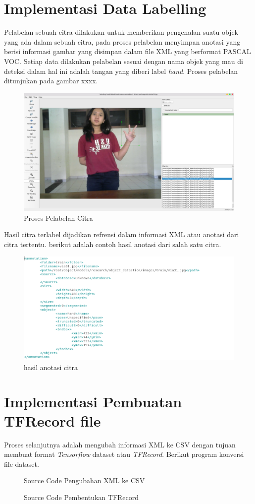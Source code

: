 \section{Implementasi Data Labelling}
Pelabelan sebuah citra dilakukan untuk memberikan pengenalan suatu objek yang ada dalam sebuah citra, pada proses pelabelan menyimpan anotasi yang berisi informasi gambar yang disimpan dalam file XML yang berformat PASCAL VOC. Setiap data dilakukan pelabelan sesuai dengan nama objek yang mau di deteksi dalam hal ini adalah tangan yang diberi label \textit{hand}. Proses pelabelan ditunjukan pada gambar xxxx.
\begin{figure}[H]
	\centering
	\includegraphics[width=0.8\linewidth]{viany}
	\caption{Proses Pelabelan Citra}
	\label{fig:viany}
\end{figure}
Hasil citra terlabel dijadikan refrensi dalam informasi XML atau anotasi dari citra tertentu. berikut adalah contoh hasil anotasi dari salah satu citra.
\begin{figure}[H]
	\centering
	\includegraphics[width=0.8\linewidth]{anotasi}
	\caption{hasil anotasi citra}
	\label{fig:anotasi}
\end{figure}
\section{Implementasi Pembuatan TFRecord file}
Proses selanjutnya adalah mengubah informasi XML ke CSV dengan tujuan membuat format \textit{Tensorflow} dataset atau \textit{TFRecord}. Berikut program konversi file dataset.
\begin{figure}[H]
	\centering
	
	\caption{Source Code Pengubahan XML ke CSV}
\end{figure}
\begin{figure}[H]
	\centering
	
	\caption{Source Code Pembentukan TFRecord}
\end{figure}
